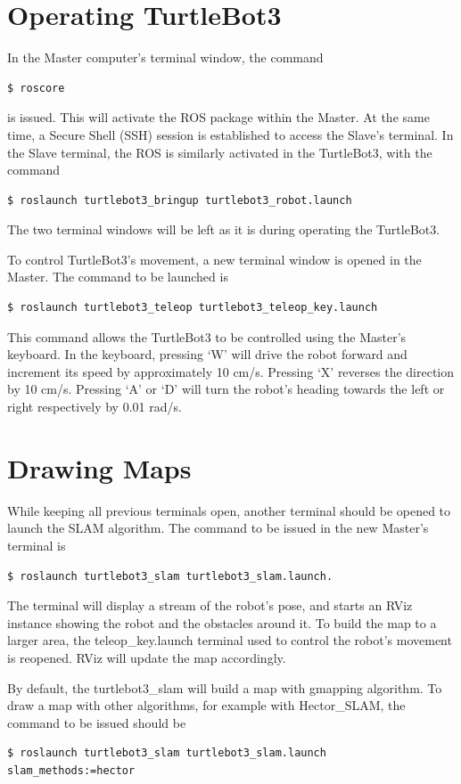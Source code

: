 \documentclass[12pt]{report}
\begin{document}
\section{Operating TurtleBot3}
In the Master computer’s terminal window, the command
\begin{verbatim}
$ roscore

\end{verbatim} 
is issued. This will activate the ROS package within the Master. At the same time, a Secure Shell (SSH) session is established to access the Slave’s terminal. In the Slave terminal, the ROS is similarly activated in the TurtleBot3, with the command
\begin{verbatim}
$ roslaunch turtlebot3_bringup turtlebot3_robot.launch

\end{verbatim} 
The two terminal windows will be left as it is during operating the TurtleBot3.\par
\vspace{1em}

To control TurtleBot3’s movement, a new terminal window is opened in the Master. The command to be launched is
\begin{verbatim}
$ roslaunch turtlebot3_teleop turtlebot3_teleop_key.launch

\end{verbatim}
This command allows the TurtleBot3 to be controlled using the Master’s keyboard. In the keyboard, pressing ‘W’ will drive the robot forward and increment its speed by approximately 10 cm/s. Pressing ‘X' reverses the direction by 10 cm/s. Pressing ‘A’ or ‘D’ will turn the robot’s heading towards the left or right respectively by 0.01 rad/s.\par
\vspace{1em}

\section{Drawing Maps}
While keeping all previous terminals open, another terminal should be opened to launch the SLAM algorithm. The command to be issued in the new Master’s terminal is \begin{verbatim}
$ roslaunch turtlebot3_slam turtlebot3_slam.launch.

\end{verbatim}
The terminal will display a stream of the robot’s pose, and starts an RViz instance showing the robot and the obstacles around it. To build the map to a larger area, the teleop\_key.launch terminal used to control the robot’s movement is reopened. RViz will update the map accordingly.\par
\vspace{1em}
By default, the turtlebot3\_slam will build a map with gmapping algorithm. To draw a map with other algorithms, for example with Hector\_SLAM, the command to be issued should be 
\begin{verbatim}
$ roslaunch turtlebot3_slam turtlebot3_slam.launch slam_methods:=hector

\end{verbatim}
\end{document}
